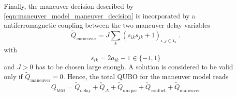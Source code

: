 Finally, the maneuver decision described by \eqref{eqn:maneuver_model_maneuver_decision} is incorporated by a antiferromagnetic coupling between the two maneuver delay variables
\begin{equation*}
    \tilde Q_\text{maneuver} = J \sum_k  \left( s_{ik} s_{jk} + 1\right)_{i, j \in I_k} \; .
\end{equation*}
with 
\begin{equation*}
    s_{ik} = 2 a_{ik} - 1 \in \{-1, 1\}
\end{equation*}
and $J>0$ has to be chosen large enough. 
A solution is considered to be valid only if $\tilde Q_\text{maneuver} = 0$.
Hence, the total QUBO for the maneuver model reads
\begin{equation*}
    Q_\text{MM} = \tilde Q_\text{delay} + \tilde Q_\Delta  + \tilde Q_\text{unique} + \tilde Q_\text{conflict} + \tilde Q_\text{maneuver} 
\end{equation*}
